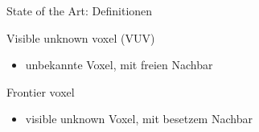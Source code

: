 \documentclass[aspectratio=169]{beamer}
\begin{document}
\begin{frame}{State of the Art: Definitionen}
	\begin{minipage}{0.4\textwidth}
		\begin{exampleblock}{Visible unknown voxel (VUV)}
			\begin{itemize}
				\item unbekannte Voxel, mit freien Nachbar
			\end{itemize}
		\end{exampleblock}
		\begin{exampleblock}{Frontier voxel}
			\begin{itemize}
				\item visible unknown Voxel, mit besetzem Nachbar
			\end{itemize}
		\end{exampleblock}
	\end{minipage}
	\begin{minipage}{0.59\textwidth}
		\centering
		\begin{figure}
			\hspace{2.2cm}
		\end{figure}
	\end{minipage}
	\centering
	\vspace{1.5cm}
	\cite{vasquez-gomez_vpl_2020}
\end{frame}
\end{document}
